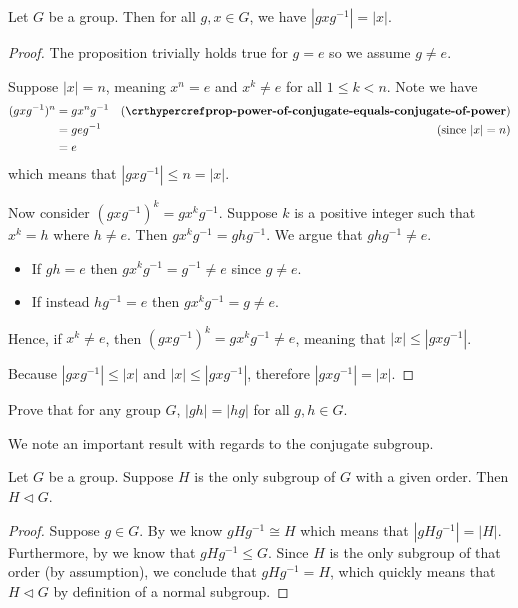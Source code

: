 \begin{proposition}\label{prop-order-of-conjugate-element-equals-order-of-element}
    Let $G$ be a group. Then for all $g, x \in G$, we have $|gxg^{-1}| = |x|$.
\end{proposition}
\begin{proof}
    The proposition trivially holds true for $g = e$ so we assume $g \neq e$.

    Suppose $|x| = n$, meaning $x^n = e$ and $x^k \neq e$ for all $1 \leq k < n$. Note we have
    \begin{align*}
        (gxg^{-1})^n  &= gx^ng^{-1} & (\myref{prop-power-of-conjugate-equals-conjugate-of-power})\\
        &= geg^{-1} & (\text{since } |x| = n)\\
        &= e
    \end{align*}
    which means that $|gxg^{-1}| \leq n = |x|$.

    Now consider $(gxg^{-1})^k = gx^kg^{-1}$. Suppose $k$ is a positive integer such that $x^k = h$ where $h \neq e$. Then $gx^kg^{-1} = ghg^{-1}$. We argue that $ghg^{-1} \neq e$.
    \begin{itemize}
        \item If $gh = e$ then $gx^kg^{-1} = g^{-1} \neq e$ since $g \neq e$.
        \item If instead $hg^{-1} = e$ then $gx^kg^{-1} = g \neq e$.
    \end{itemize}
    Hence, if $x^k \neq e$, then $(gxg^{-1})^k = gx^kg^{-1} \neq e$, meaning that $|x| \leq |gxg^{-1}|$.

    Because $|gxg^{-1}| \leq |x|$ and $|x| \leq |gxg^{-1}|$, therefore $|gxg^{-1}| = |x|$.
\end{proof}

\begin{exercise}
    Prove that for any group $G$, $|gh| = |hg|$ for all $g, h \in G$.
\end{exercise}

We note an important result with regards to the conjugate subgroup.
\begin{theorem}\label{thrm-unique-subgroup-of-given-order-is-normal}
    Let $G$ be a group. Suppose $H$ is the only subgroup of $G$ with a given order. Then $H \lhd G$.
\end{theorem}
\begin{proof}
    Suppose $g \in G$. By  we know $gHg^{-1} \cong H$ which means that $|gHg^{-1}| = |H|$. Furthermore, by  we know that $gHg^{-1} \leq G$. Since $H$ is the only subgroup of that order (by assumption), we conclude that $gHg^{-1} = H$, which quickly means that $H \lhd G$ by definition of a normal subgroup.
\end{proof}

